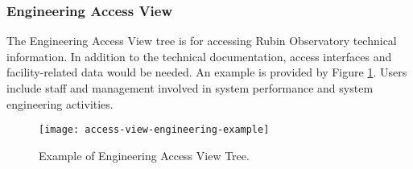 \subsubsection{Engineering Access View}

The Engineering Access View tree is for accessing Rubin Observatory technical information.
In addition to the technical documentation, access interfaces and facility-related data would be needed.
An example is provided by Figure \ref{fig:access-view-engineering-example}.
Users include staff and management involved in system performance and system engineering activities.

\begin{figure}[ht]
\centering
\texttt{[image: access-view-engineering-example]}
\caption{Example of Engineering Access View Tree.}
\label{fig:access-view-engineering-example}
\end{figure}
